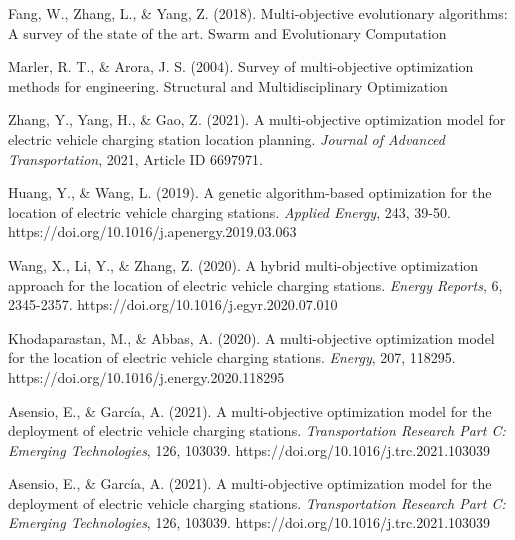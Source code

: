 \begin{thebibliography}{99}
     Fang, W., Zhang, L., \& Yang, Z. (2018). Multi-objective evolutionary algorithms: A survey of the state of the art. Swarm and Evolutionary Computation

     Marler, R. T., \& Arora, J. S. (2004). Survey of multi-objective optimization methods for engineering. Structural and Multidisciplinary Optimization

    Zhang, Y., Yang, H., \& Gao, Z. (2021). A multi-objective optimization model for electric vehicle charging station location planning. \textit{Journal of Advanced Transportation}, 2021, Article ID 6697971.

     Huang, Y., \& Wang, L. (2019). A genetic algorithm-based optimization for the location of electric vehicle charging stations. \textit{Applied Energy}, 243, 39-50. https://doi.org/10.1016/j.apenergy.2019.03.063

  


%
     Wang, X., Li, Y., \& Zhang, Z. (2020). A hybrid multi-objective optimization approach for the location of electric vehicle charging stations. \textit{Energy Reports}, 6, 2345-2357. https://doi.org/10.1016/j.egyr.2020.07.010



     Khodaparastan, M., \& Abbas, A. (2020). A multi-objective optimization model for the location of electric vehicle charging stations. \textit{Energy}, 207, 118295. https://doi.org/10.1016/j.energy.2020.118295

     Asensio, E., \& García, A. (2021). A multi-objective optimization model for the deployment of electric vehicle charging stations. \textit{Transportation Research Part C: Emerging Technologies}, 126, 103039. https://doi.org/10.1016/j.trc.2021.103039


     Asensio, E., \& García, A. (2021). A multi-objective optimization model for the deployment of electric vehicle charging stations. \textit{Transportation Research Part C: Emerging Technologies}, 126, 103039. https://doi.org/10.1016/j.trc.2021.103039


\end{thebibliography}
